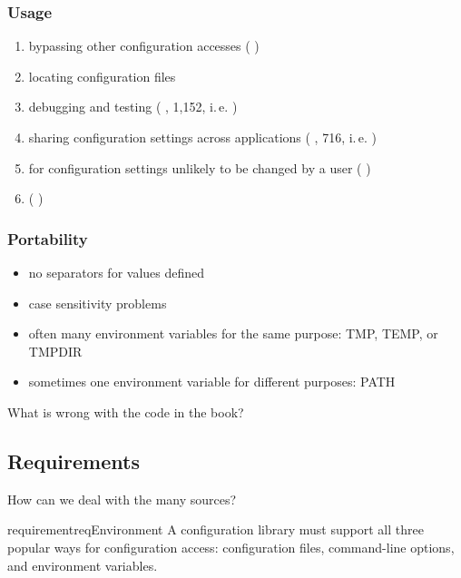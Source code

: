 \begin{frame}
	\frametitle{Usage}
	\begin{enumerate}
	\item bypassing other configuration accesses (\methodQuestion{} )
	\item locating configuration files
	\item debugging and testing (\methodQuestion{} , \methodSource{} 1,152, i.\,e. )
	\item sharing configuration settings across applications (\methodQuestion{} , \methodSource{} 716, i.\,e. )
	\item for configuration settings unlikely to be changed by a user (\methodQuestion{} )
	\item {} (\methodQuestion{} )
	\end{enumerate}
\end{frame}

\begin{frame}
	\frametitle{Portability}
	\begin{itemize}
	\item no separators for values defined
	\item case sensitivity problems
	\item often many environment variables for the same purpose: TMP, TEMP, or TMPDIR
	\item sometimes one environment variable for different purposes: PATH
	\end{itemize}
\end{frame}

\begin{assignment}
	\begin{task}
	What is wrong with the code in the book?
	\end{task}
\end{assignment}



\subsection{Requirements}

\begin{frame}
	How can we deal with the many sources?

	\vspace{1cm}

	\begin{restatable}{requirement}{reqEnvironment}
	A configuration library must support all three popular ways for configuration access:
	configuration files, command-line options, and environment variables.
	\end{restatable}
\end{frame}

